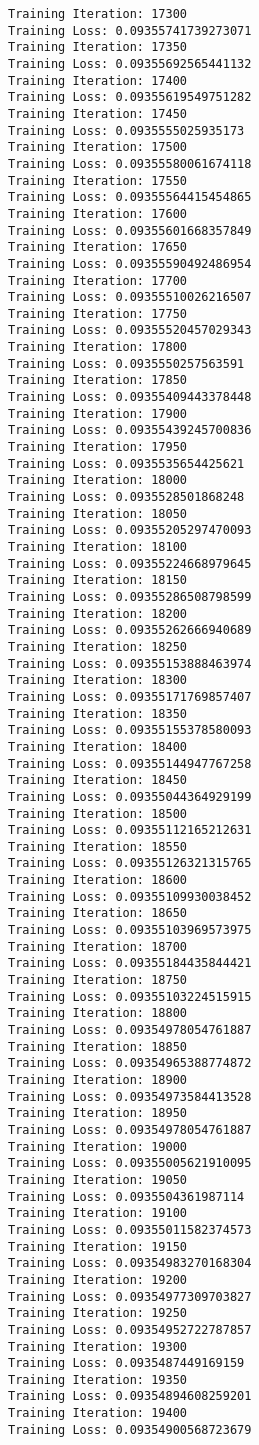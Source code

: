 \documentclass[11pt]{article}
\begin{document}
\begin{Verbatim}[commandchars=\\\{\}]
Training Iteration: 17300
Training Loss: 0.09355741739273071
Training Iteration: 17350
Training Loss: 0.09355692565441132
Training Iteration: 17400
Training Loss: 0.09355619549751282
Training Iteration: 17450
Training Loss: 0.0935555025935173
Training Iteration: 17500
Training Loss: 0.09355580061674118
Training Iteration: 17550
Training Loss: 0.09355564415454865
Training Iteration: 17600
Training Loss: 0.09355601668357849
Training Iteration: 17650
Training Loss: 0.09355590492486954
Training Iteration: 17700
Training Loss: 0.09355510026216507
Training Iteration: 17750
Training Loss: 0.09355520457029343
Training Iteration: 17800
Training Loss: 0.0935550257563591
Training Iteration: 17850
Training Loss: 0.09355409443378448
Training Iteration: 17900
Training Loss: 0.09355439245700836
Training Iteration: 17950
Training Loss: 0.0935535654425621
Training Iteration: 18000
Training Loss: 0.0935528501868248
Training Iteration: 18050
Training Loss: 0.09355205297470093
Training Iteration: 18100
Training Loss: 0.09355224668979645
Training Iteration: 18150
Training Loss: 0.09355286508798599
Training Iteration: 18200
Training Loss: 0.09355262666940689
Training Iteration: 18250
Training Loss: 0.09355153888463974
Training Iteration: 18300
Training Loss: 0.09355171769857407
Training Iteration: 18350
Training Loss: 0.09355155378580093
Training Iteration: 18400
Training Loss: 0.09355144947767258
Training Iteration: 18450
Training Loss: 0.09355044364929199
Training Iteration: 18500
Training Loss: 0.09355112165212631
Training Iteration: 18550
Training Loss: 0.09355126321315765
Training Iteration: 18600
Training Loss: 0.09355109930038452
Training Iteration: 18650
Training Loss: 0.09355103969573975
Training Iteration: 18700
Training Loss: 0.09355184435844421
Training Iteration: 18750
Training Loss: 0.09355103224515915
Training Iteration: 18800
Training Loss: 0.09354978054761887
Training Iteration: 18850
Training Loss: 0.09354965388774872
Training Iteration: 18900
Training Loss: 0.09354973584413528
Training Iteration: 18950
Training Loss: 0.09354978054761887
Training Iteration: 19000
Training Loss: 0.09355005621910095
Training Iteration: 19050
Training Loss: 0.0935504361987114
Training Iteration: 19100
Training Loss: 0.09355011582374573
Training Iteration: 19150
Training Loss: 0.09354983270168304
Training Iteration: 19200
Training Loss: 0.09354977309703827
Training Iteration: 19250
Training Loss: 0.09354952722787857
Training Iteration: 19300
Training Loss: 0.0935487449169159
Training Iteration: 19350
Training Loss: 0.09354894608259201
Training Iteration: 19400
Training Loss: 0.09354900568723679

\end{Verbatim}
\end{document}
